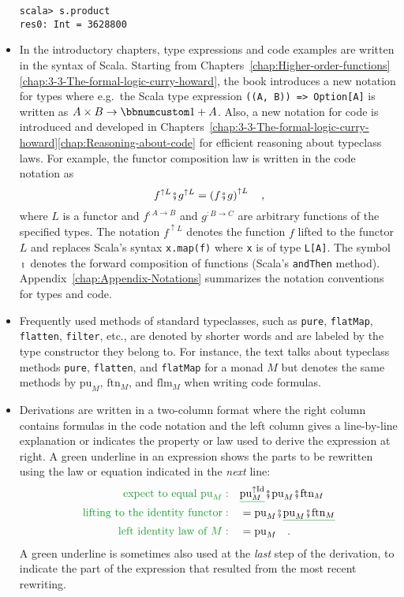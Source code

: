 \begin{itemize}
\begin{lstlisting}[mathescape=true]
scala> s.product
res0: Int = 3628800 
\end{lstlisting}
\item In the introductory chapters, type expressions and code examples are
written in the syntax of Scala. Starting from Chapters~\ref{chap:Higher-order-functions}\textendash \ref{chap:3-3-The-formal-logic-curry-howard},
the book introduces a new notation for types where e.g.~the Scala
type expression \lstinline!((A, B)) => Option[A]! is written as $A\times B\rightarrow\bbnum 1+A$.
Also, a new notation for code is introduced and developed in Chapters~\ref{chap:3-3-The-formal-logic-curry-howard}\textendash \ref{chap:Reasoning-about-code}
for efficient reasoning about typeclass laws. For example, the functor
composition law is written in the code notation as
\[
f^{\uparrow L}\bef g^{\uparrow L}=\left(f\bef g\right)^{\uparrow L}\quad,
\]
where $L$ is a functor and $f^{:A\rightarrow B}$ and $g^{:B\rightarrow C}$
are arbitrary functions of the specified types. The notation $f^{\uparrow L}$
denotes the function $f$ lifted to the functor $L$ and replaces
Scala's syntax \lstinline!x.map(f)! where \lstinline!x! is of type
\lstinline!L[A]!. The symbol $\bef$ denotes the forward composition
of functions (Scala's \lstinline!andThen! method). Appendix~\ref{chap:Appendix-Notations}
summarizes the notation conventions for types and code.
\item Frequently used methods of standard typeclasses, such as \lstinline!pure!,
\lstinline!flatMap!, \lstinline!flatten!, \lstinline!filter!, etc.,
are denoted by shorter words and are labeled by the type constructor
they belong to. For instance, the text talks about typeclass methods
\lstinline!pure!, \lstinline!flatten!, and \lstinline!flatMap!
for a monad $M$ but denotes the same methods by $\text{pu}_{M}$,
$\text{ftn}_{M}$, and $\text{flm}_{M}$ when writing code formulas.
\item Derivations are written in a two-column format where the right column
contains formulas in the code notation and the left column gives a
line-by-line explanation or indicates the property or law used to
derive the expression at right. A green underline in an expression
shows the parts to be rewritten using the law or equation indicated
in the \emph{next} line:
\begin{align*}
{\color{greenunder}\text{expect to equal }\text{pu}_{M}:}\quad & \gunderline{\text{pu}_{M}^{\uparrow\text{Id}}}\bef\text{pu}_{M}\bef\text{ftn}_{M}\\
{\color{greenunder}\text{lifting to the identity functor}:}\quad & =\text{pu}_{M}\bef\gunderline{\text{pu}_{M}\bef\text{ftn}_{M}}\\
{\color{greenunder}\text{left identity law of }M:}\quad & =\text{pu}_{M}\quad.
\end{align*}
A green underline is sometimes also used at the \emph{last} step of
the derivation, to indicate the part of the expression that resulted
from the most recent rewriting.
\end{itemize}

